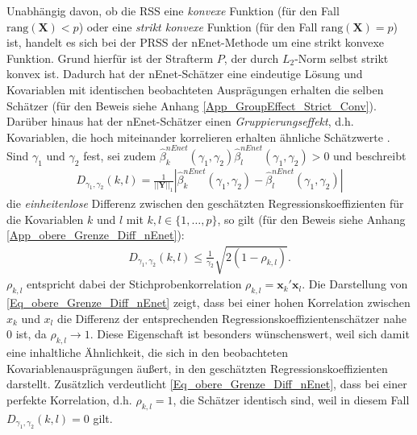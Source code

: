 \documentclass[12pt, a4paper]{report}\usepackage[]{graphicx}\usepackage[]{color}
\begin{document}
Unabhängig davon, ob die RSS eine \textit{konvexe} Funktion (für den Fall $\text{rang}(\mathbf{X})< p$) oder eine \textit{strikt konvexe} Funktion (für den Fall $\text{rang}(\mathbf{X})= p$) ist, handelt es sich bei der PRSS der nEnet-Methode um eine strikt konvexe Funktion. Grund hierfür ist der Strafterm $P$, der durch $L_2$-Norm selbst strikt konvex ist. Dadurch hat der nEnet-Schätzer eine eindeutige Lösung und Kovariablen mit identischen beobachteten Ausprägungen erhalten die selben Schätzer (für den Beweis siehe Anhang \ref{App_GroupEffect_Strict_Conv}). Darüber hinaus hat der nEnet-Schätzer einen \textit{Gruppierungseffekt}, d.h. Kovariablen, die hoch miteinander korrelieren erhalten ähnliche Schätzwerte \cite{zou_regularization_2005}. Sind $\gamma_1$ und $\gamma_2$ fest, sei zudem $\hat{\beta}_k^{nEnet}(\gamma_1,\gamma_2)\hat{\beta}_l^{nEnet}(\gamma_1,\gamma_2)>0$ und beschreibt
\begin{align*}
D_{\gamma_1,\gamma_2}(k,l)=\frac{1}{||\mathbf{Y}||_1}|\hat{\beta}_k^{nEnet}(\gamma_1,\gamma_2)-\hat{\beta}_l^{nEnet}(\gamma_1,\gamma_2)|
\end{align*}
die \textit{einheitenlose} Differenz zwischen den geschätzten Regressionskoeffizienten für die Kovariablen $k$ und $l$ mit $k,l \in \{1,\dots,p\}$, so gilt (für den Beweis siehe Anhang \ref{App_obere_Grenze_Diff_nEnet}):
\begin{align}\label{Eq_obere_Grenze_Diff_nEnet}
D_{\gamma_1,\gamma_2}(k,l) \leq \frac{1}{\gamma_2}\sqrt{2(1-\rho_{k,l})}.
\end{align}
$\rho_{k,l}$ entspricht dabei der Stichprobenkorrelation $\rho_{k,l}=\mathbf{x}_k{'}\mathbf{x}_l$. Die Darstellung von \eqref{Eq_obere_Grenze_Diff_nEnet} zeigt, dass bei einer hohen Korrelation zwischen $x_k$ und $x_l$ die Differenz der entsprechenden Regressionskoeffizientenschätzer nahe 0 ist, da $\rho_{k,l} \rightarrow 1$. Diese Eigenschaft ist besonders wünschenswert, weil sich damit eine inhaltliche Ähnlichkeit, die sich in den beobachteten Kovariablenausprägungen äußert, in den geschätzten Regressionskoeffizienten darstellt. Zusätzlich verdeutlicht \eqref{Eq_obere_Grenze_Diff_nEnet}, dass bei einer perfekte Korrelation, d.h. $\rho_{k,l}=1$, die Schätzer identisch sind, weil in diesem Fall $D_{\gamma_1,\gamma_2}(k,l)=0$ gilt. %
\\
\end{document}
